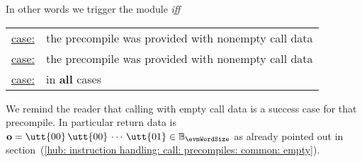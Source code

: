 \saNote{} In other words we trigger the \mmuMod{} module \emph{iff}
\begin{center}
	\begin{tabular}{|ll|}
		\hline
		\underline{\instEcadd{} case:}     & the precompile was provided with nonempty call data \\
		\underline{\instEcmul{} case:}     & the precompile was provided with nonempty call data \\
		\underline{\instEcpairing{} case:} & in \textbf{all} cases                               \\ \hline
	\end{tabular}
\end{center}
We remind the reader that calling \instEcpairing{} with empty call data is a success case for that precompile.
In particular return data is $\textbf{o} =
\utt{00}\,
\utt{00}\, \cdots \,
\utt{01}
\in \mathbb{B}_{\evmWordSize}$ as already pointed out in
section~(\ref{hub: instruction handling: call: precompiles: common: empty}).
